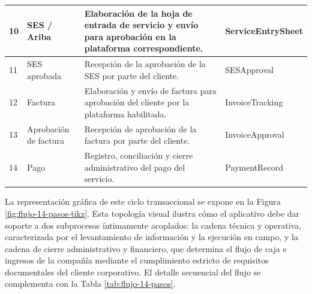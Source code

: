 \begin{center}
\begin{longtable}{|p{0.9cm}|p{3.0cm}|p{7.1cm}|p{2.4cm}|}
10 & SES / Ariba & Elaboración de la hoja de entrada de servicio y envío para aprobación en la plataforma correspondiente. & ServiceEntrySheet\\ \hline
11 & SES aprobada & Recepción de la aprobación de la SES por parte del cliente. & SESApproval\\ \hline
12 & Factura & Elaboración y envío de factura para aprobación del cliente por la plataforma habilitada. & InvoiceTracking\\ \hline
13 & Aprobación de factura & Recepción de aprobación de la factura por parte del cliente. & InvoiceApproval\\ \hline
14 & Pago & Registro, conciliación y cierre administrativo del pago del servicio. & PaymentRecord\\ \hline
\end{longtable}
\end{center}

La representación gráfica de este ciclo transaccional se expone en la Figura \ref{fig:flujo-14-pasos-tikz}. Esta topología visual ilustra cómo el aplicativo debe dar soporte a dos subprocesos íntimamente acoplados: la cadena técnica y operativa, caracterizada por el levantamiento de información y la ejecución en campo, y la cadena de cierre administrativo y financiero, que determina el flujo de caja e ingresos de la compañía mediante el cumplimiento estricto de requisitos documentales del cliente corporativo. El detalle secuencial del flujo se complementa con la Tabla \ref{tab:flujo-14-pasos}.


